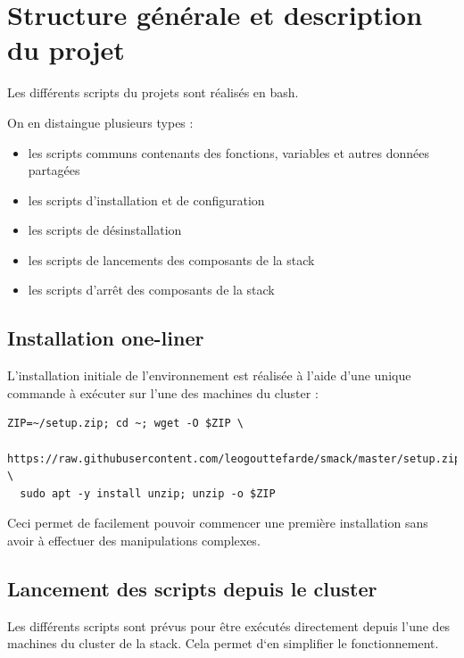 \documentclass[a4paper, 11pt, titlepage]{article}
\begin{document}
\section {Structure générale et description du projet}

Les différents scripts du projets sont réalisés en bash.

\noindent On en distaingue plusieurs types :

\begin{itemize}

\item
les scripts communs contenants des fonctions, variables et autres données partagées

\item
les scripts d'installation et de configuration

\item
les scripts de désinstallation

\item
les scripts de lancements des composants de la stack

\item
les scripts d'arrêt des composants de la stack

\end{itemize}



\subsection {Installation one-liner}

L'installation initiale de l'environnement est réalisée à l'aide d'une unique commande à exécuter sur l'une des machines du cluster :

\begin{verbatim}
ZIP=~/setup.zip; cd ~; wget -O $ZIP \
  https://raw.githubusercontent.com/leogouttefarde/smack/master/setup.zip; \
  sudo apt -y install unzip; unzip -o $ZIP
\end{verbatim}

Ceci permet de facilement pouvoir commencer une première installation sans avoir à effectuer des manipulations complexes.


\subsection {Lancement des scripts depuis le cluster}

Les différents scripts sont prévus pour être exécutés directement depuis l'une des machines du cluster de la stack. Cela permet d‘en simplifier le fonctionnement.
\end{document}
